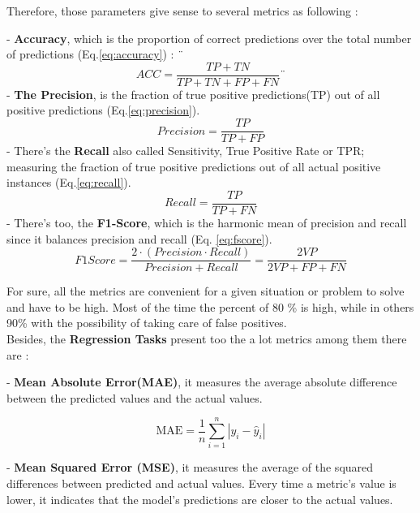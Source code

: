 \documentclass[12pt,a4paper, oneside]{book}
\begin{document}
Therefore, those parameters give sense to several metrics as following : 

- \textbf{Accuracy}, which is the proportion of correct predictions over the total number of predictions (Eq.\ref{eq:accuracy}) : 
¨
\begin{equation} 
\label{eq:accuracy}
	ACC = \frac{TP+TN}{TP+TN+FP+FN} 
¨\end{equation} 
- \textbf{The Precision}, is the fraction of true positive predictions(TP) out of all positive predictions (Eq.\ref{eq:precision}). 
\begin{equation}
	\label{eq:precision} 
	Precision = \frac{TP}{TP+FP}
\end{equation}  
- There's the \textbf{Recall} also called Sensitivity, True Positive Rate or TPR; measuring the fraction of true positive predictions out of all actual positive instances (Eq.\ref{eq:recall}). 
\begin{equation}
	\label{eq:recall}  
	Recall = \frac{TP}{TP+FN}
\end{equation} 
- There's too, the \textbf{F1-Score}, which is the harmonic mean of precision and recall since it balances precision and recall (Eq. \ref{eq:fscore}). 
\begin{equation}
\label{eq:fscore}
F1Score = \frac{2 \cdot (Precision \cdot Recall)}{Precision + Recall} = \frac{2VP}{2VP + FP + FN}
\end{equation}

For sure, all the metrics are convenient for a given situation or problem to solve and have to be high. Most of the time the percent of 80 \% is high, while in others 90\% with the possibility of taking care of false positives.  \\

Besides, the \textbf{Regression Tasks} present too the a lot metrics among them there are \cite{coursAnalyseDonne3} : 

- \textbf{Mean Absolute Error(MAE)}, it measures the average absolute difference between the predicted values and the actual values. 

\begin{equation}
	\text{MAE} = \frac{1}{n} \sum_{i=1}^{n} |y_i - \hat{y}_i|
\end{equation}

- \textbf{Mean Squared Error (MSE)}, it measures the average of the squared differences between predicted and actual values.
 Every time a metric's value is lower, it indicates that the model's predictions are closer to the actual values. 
\end{document}
